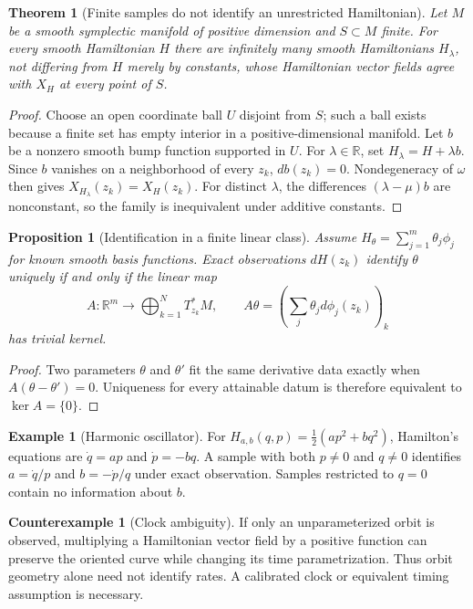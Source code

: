 \documentclass[12pt]{article}
\newtheorem{proposition}[definition]{Proposition}
\newtheorem{theorem}[definition]{Theorem}
\theoremstyle{definition}
\newtheorem{example}[definition]{Example}
\newtheorem{counterexample}[definition]{Counterexample}
\begin{document}
\begin{theorem}[Finite samples do not identify an unrestricted Hamiltonian]
Let $M$ be a smooth symplectic manifold of positive dimension and $S\subset M$ finite. For every smooth Hamiltonian $H$ there are infinitely many smooth Hamiltonians $H_\lambda$, not differing from $H$ merely by constants, whose Hamiltonian vector fields agree with $X_H$ at every point of $S$.
\end{theorem}
\begin{proof}
Choose an open coordinate ball $U$ disjoint from $S$; such a ball exists because a finite set has empty interior in a positive-dimensional manifold. Let $b$ be a nonzero smooth bump function supported in $U$. For $\lambda\in\mathbb R$, set $H_\lambda=H+\lambda b$. Since $b$ vanishes on a neighborhood of every $z_k$, $db(z_k)=0$. Nondegeneracy of $\omega$ then gives $X_{H_\lambda}(z_k)=X_H(z_k)$. For distinct $\lambda$, the differences $(\lambda-\mu)b$ are nonconstant, so the family is inequivalent under additive constants.
\end{proof}

\begin{proposition}[Identification in a finite linear class]
Assume $H_\theta=\sum_{j=1}^m\theta_j\phi_j$ for known smooth basis functions. Exact observations $dH(z_k)$ identify $\theta$ uniquely if and only if the linear map
\[
A:\mathbb R^m\to\bigoplus_{k=1}^NT^*_{z_k}M,
\qquad A\theta=(\sum_j\theta_jd\phi_j(z_k))_k
\]
has trivial kernel.
\end{proposition}
\begin{proof}
Two parameters $\theta$ and $\theta'$ fit the same derivative data exactly when $A(\theta-\theta')=0$. Uniqueness for every attainable datum is therefore equivalent to $\ker A=\{0\}$.
\end{proof}

\begin{example}[Harmonic oscillator]
For $H_{a,b}(q,p)=\tfrac12(ap^2+bq^2)$, Hamilton's equations are $\dot q=ap$ and $\dot p=-bq$. A sample with both $p\neq0$ and $q\neq0$ identifies $a=\dot q/p$ and $b=-\dot p/q$ under exact observation. Samples restricted to $q=0$ contain no information about $b$.
\end{example}

\begin{counterexample}[Clock ambiguity]
If only an unparameterized orbit is observed, multiplying a Hamiltonian vector field by a positive function can preserve the oriented curve while changing its time parametrization. Thus orbit geometry alone need not identify rates. A calibrated clock or equivalent timing assumption is necessary.
\end{counterexample}
\end{document}
